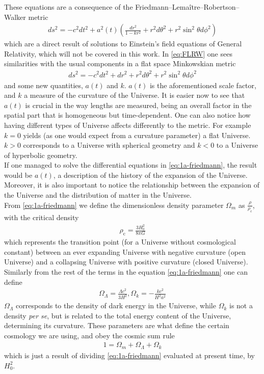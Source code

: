 These equations are a consequence of the Friedmann–Lemaître–Robertson–Walker metric \cite{cosmology}
\begin{align}
	ds ^2 = -c^2 dt^2  + a^2(t) \left( \frac{dr^2}{1-kr^2} +r^2d\theta ^2 + r^2 \sin^2\theta d\phi^2\right) 
	\label{eq:FLRW}
\end{align}which are a direct result of solutions to Einstein's field equations of General Relativity, which will not be covered in this work. In \eqref{eq:FLRW} one sees similarities with the usual components in a flat space Minkowskian metric 
\begin{align}
	ds^2 = -c^2dt^2 + dr^2 + r^2d\theta^2 + r^2 \sin^2\theta d\phi^2
\end{align} and some new quantities, $a(t)$ and $k$. $a(t)$ is the aforementioned scale factor, and $k$ a measure of the curvature of the Universe. It is easier now to see that $a(t)$ is crucial in the way lengths are measured, being an overall factor in the spatial part that is homogeneous but time-dependent. One can also notice how having different types of Universe affects differently to the metric. For example $k=0$ yields (as one would expect from a curvature parameter) a flat Universe. $k>0$ corresponds to a Universe with spherical geometry and $k<0$ to a Universe of hyperbolic geometry. \\

If one managed to solve the differential equations in \eqref{eq:1a-friedmann}, the result would be $a(t)$, a description of the history of the expansion of the Universe. Moreover, it is also important to notice the relationship between the expansion of the Universe and the distribution of matter in the Universe. \\

From \eqref{eq:1a-friedmann} we define the dimensionless density parameter $\Omega_m$ as $\frac{\rho}{\rho_{\text{c}}}$, with the critical density 
\begin{align}
	\rho_{\text{c}} = \frac{3H_0^2}{8\pi G}
\end{align} which represents the transition point (for a Universe without cosmological constant) between an ever expanding Universe with negative curvature (open Universe) and a collapsing Universe with positive curvature (closed Universe). Similarly from the rest of the terms in the equation \eqref{eq:1a-friedmann} one can define
\begin{align}
 \Omega_\Lambda = \frac{\Lambda c^2}{3H^2}, \Omega_k = -\frac{kc^2}{H^2a^2} 
 \label{eq:definitions}
\end{align}
$\Omega_\Lambda$ corresponds to the density of dark energy in the Universe, while $\Omega_k$ is not a density \textit{per se}, but is related to the total energy content of the Universe, determining its curvature.
These parameters are what define the certain cosmology we are using, and obey the cosmic sum rule 
\begin{align}
	1 = \Omega_m + \Omega_\Lambda + \Omega_k
	\label{eq:cosmic-sum-rule}
\end{align}
which is just a result of dividing \eqref{eq:1a-friedmann} evaluated at present time, by  $H_0^2$. \\

